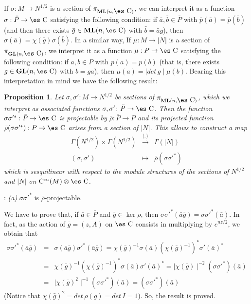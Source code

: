 \documentclass[12pt]{article}
\theoremstyle{plain}
\newtheorem{prop}{Proposition}
\def\beann{\begin{eqnarray*}}
\def\eeann{\end{eqnarray*}}
\def\mapping#1{\mathrel{\mathop{\longrightarrow}\limits^{#1}}}
\def\GL{{\bf GL}(n,\Complex )}
\def\ML{{\bf ML}(n,\Complex )}
\def\Complex{\mbox{\es C}}
\def\Cinfty{{\rm C}^\infty}
\begin{document}
If $\sigma : M \to N^{1/2}$ is a section of $\pi_{\ML}$, we can
interpret it as a function $\sigma : \bar P \to \Complex$
satisfying the following condition: if $\bar a, \bar b \in \bar P$
with $\bar p (\bar a) = \bar p (\bar b)$ (and then there exists
$\bar g \in \ML$ with $\bar b = \bar a \bar g$), then $\sigma
(\bar a) = \chi (\bar g) \sigma (\bar b)$. In a similar way, If
$\mu : M \to | N |$ is a section of $\pi_{\GL}$, we interpret it
as a function $\mu : P \to \Complex$ satisfying the following
condition: if $a,b \in P$ with $p(a) = p(b)$ (that is, there
exists $g \in \GL$ with $b=ga$), then $\mu (a) = \mid det\, g \mid
\mu (b)$. Bearing this interpretation in mind we have the
following result:

\begin{prop}
Let $\sigma ,\sigma '\colon M \to N^{1/2}$ be sections of
$\pi_{\ML}$, which we interpret as associated functions $\sigma
,\sigma ' \colon\bar P \to \Complex$. Then the function $\sigma
\sigma '^* : \bar P \to \Complex$ is projectable by $\bar \rho :
\bar P \to P$ and its projected function $\bar \rho (\sigma \sigma
'^*) : \bar P \to \Complex$ arises from a section of $| N |$. This
allows to construct a map $$
\begin{array}{ccc}
\Gamma (N^{1/2}) \times \Gamma (N^{1/2})
& \mapping{\langle , \rangle} &
\Gamma (| N |)
\\
(\sigma ,\sigma ') & \mapsto & \bar \rho (\sigma \sigma '^*)
\end{array}
$$
which is sesquilinear with respect to the module structures of the
sections of
$N^{1/2}$ and $| N |$ on $\Cinfty(M)\otimes\Complex$.
\label{propi1}
\end{prop}
: 
{\it (a)} \quad
$\sigma \sigma '^*$ is $\bar \rho$-projectable.

We have to prove that, if $\bar a \in \bar P$ and $\bar g \in \ker
\rho$, then
$\sigma \sigma '^*(\bar a \bar g) = \sigma \sigma '^*(\bar a)$.
In fact, as the action of $\bar g = \overline{(z,A)}$ on $\Complex$
consists in multiplying by
$e^{nz/2}$, we obtain that
\beann
\sigma \sigma '^*(\bar a \bar g)
& = &
\sigma (\bar a \bar g) \sigma '^*(\bar a \bar g) =
\chi (\bar g)^{-1} \sigma (\bar a)
(\chi (\bar g)^{-1})^* \sigma '(\bar a)^*
\\
& = &
\chi (\bar g)^{-1} (\chi (\bar g)^{-1})^*
\sigma (\bar a) \sigma '(\bar a)^* =
\mid \chi (\bar g) \mid ^{-2} (\sigma \sigma '^*)(\bar a) \\
&=&
\mid \chi (\bar g)^2 \mid ^{-1} (\sigma \sigma '^*)(\bar a)=
(\sigma{\sigma '}^*)(\bar a)
\eeann
(Notice that $\chi (\bar g)^2 = det\, \rho (g) = det\, I = 1$).
So, the result is proved.
\end{document}
